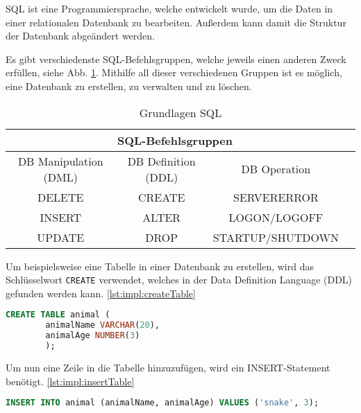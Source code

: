 
SQL ist eine Programmiersprache, welche entwickelt wurde, um die Daten in einer relationalen Datenbank zu bearbeiten. Außerdem kann damit die Struktur der Datenbank abgeändert werden. \cite{einfuerhungSQLBuch} 
 
Es gibt verschiedenste SQL-Befehlsgruppen, welche jeweils einen anderen Zweck erfüllen, siehe Abb. \ref{tab:allgemein:grundlagenSQL}.
Mithilfe all dieser verschiedenen Gruppen ist es möglich, eine Datenbank zu erstellen, zu verwalten und zu löschen.

\begin{table}
    \centering
    \begin{tabular}{ |c|c|c|c| }
     \hline
     \multicolumn{3}{|c|}{SQL-Befehlsgruppen } \\
     \hline
     \hline
     DB Manipulation (DML) & DB Definition (DDL) & DB Operation  \\
     \hline
     \hline
     DELETE & CREATE & SERVERERROR \\
     \hline
     INSERT & ALTER & LOGON/LOGOFF \\
     \hline
     UPDATE & DROP & STARTUP/SHUTDOWN \\
     \hline
    \end{tabular}
    \caption{Grundlagen SQL \cite{grundlagenSQL}}
    
    \label{tab:allgemein:grundlagenSQL}
\end{table}
 

 
Um beispielsweise eine Tabelle in einer Datenbank zu erstellen, wird das Schlüsselwort \texttt{CREATE} verwendet, welches in der Data Definition Language (DDL) gefunden werden kann. \ref{lst:impl:createTable}
 
\begin{lstlisting}[language=sql,caption=CREATE table,label=lst:impl:createTable]
    CREATE TABLE animal (
        animalName VARCHAR(20),
        animalAge NUMBER(3)
        );
\end{lstlisting}
 
Um nun eine Zeile in die Tabelle hinzuzufügen, wird ein INSERT-Statement benötigt. \ref{lst:impl:insertTable}
 
\begin{lstlisting}[language=sql,caption=INSERT INTO table,label=lst:impl:insertTable]
        INSERT INTO animal (animalName, animalAge) VALUES ('snake', 3);
\end{lstlisting}
 
